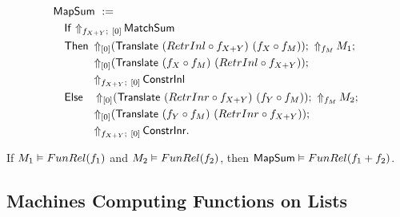 \begin{definition}[$\MS{MapSum}$]
  \label{def:MapSum}
  ~
  \begin{align*}
    & \MS{MapSum}~:= \\
    &\quad \MS{If}~{\LiftBoth{\MS{MatchSum}}{f_{X+Y}}{\Vector{0}}} \\
    &\quad \MS{Then}~ \LiftTapes{(\MS{Translate}~(RetrInl \circ f_{X+Y})~(f_X \circ f_M))}{\Vector{0}} \Seq \LiftAlphabet{M_1}{f_M} \Seq \\
    &\quad \phantom{\MS{Then}}~ \LiftTapes{(\MS{Translate}~(f_X \circ f_M)~(RetrInl \circ f_{X+Y}))}{\Vector{0}} \Seq \\
    &\quad \phantom{\MS{Then}}~ \LiftBoth{\MS{ConstrInl}}{f_{X+Y}}{\Vector{0}} \\
    &\quad \MS{Else}~~~ \LiftTapes{(\MS{Translate}~(RetrInr \circ f_{X+Y})~(f_Y \circ f_M))}{\Vector{0}} \Seq \LiftAlphabet{M_2}{f_M} \Seq \\
    &\quad \phantom{\MS{Then}}~ \LiftTapes{(\MS{Translate}~(f_Y \circ f_M)~(RetrInr \circ f_{X+Y}))}{\Vector{0}} \Seq \\
    &\quad \phantom{\MS{Then}}~ \LiftBoth{\MS{ConstrInr}}{f_{X+Y}}{\Vector{0}}.
  \end{align*}

\end{definition}

\begin{lemma}
  \label{lem:MapSum_Computes}
  If $M_1 \mathrel{\vDash} FunRel(f_1)$ and $M_2 \mathrel{\vDash} FunRel(f_2)$, then $\mathsf{MapSum} \mathrel{\vDash} FunRel(f_1+f_2)$.
\end{lemma}


\subsection{Machines Computing Functions on Lists}
\label{sec:ListTM}





